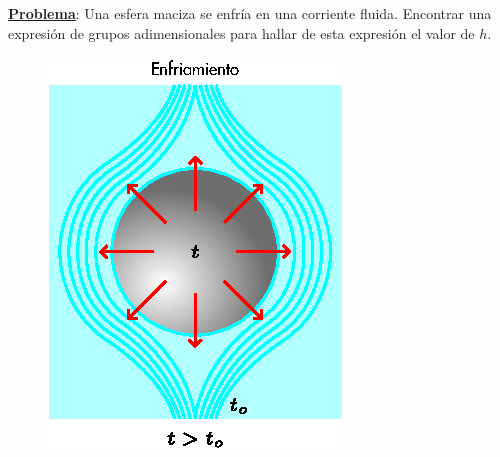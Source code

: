 \textbf{\underline{Problema}}: Una esfera maciza se enfría en una corriente
fluida. Encontrar una expresión de grupos adimensionales para hallar de esta
expresión el valor de $h$.

\begin{figure}[!h]
\centering
\includegraphics[scale=1.40]{figura04_03.eps}
\end{figure}

